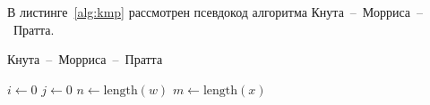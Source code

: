 \newpage
В листинге~\ref{alg:kmp} рассмотрен псевдокод алгоритма Кнута~--~Морриса~--~Пратта.

\begin{algorithm}[H]
	\caption{Кнута~--~Морриса~--~Пратта}
	\label{alg:kmp}
	\SetAlgoLined
	$i \gets 0$\;
	$j \gets 0$\;
	$n \gets \text{length}(w)$\;
	$m \gets \text{length}(x)$\;
	\;
\end{algorithm}